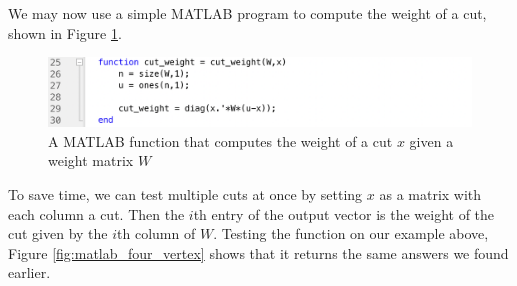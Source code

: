 \par We may now use a simple MATLAB program to compute the weight of a cut, shown in Figure \ref{fig:matlab_cut_weight_function}. \\

\begin{figure}[h]
    \centering
    \includegraphics[scale=.5]{matlab_function.png}
    \caption{A MATLAB function that computes the weight of a cut $x$ given a weight matrix $W$}
    \label{fig:matlab_cut_weight_function}
\end{figure}

\par To save time, we can test multiple cuts at once by setting $x$ as a matrix with each column a cut. Then the $i$th entry of the output vector is the weight of the cut given by the $i$th column of $W$. Testing the function on our example above, Figure \ref{fig:matlab_four_vertex} shows that it returns the same answers we found earlier. \\

